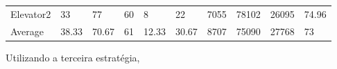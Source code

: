 \documentclass[a4paper]{article}
\begin{document}
\begin{table}[h]
\begin{tabular}{@{}llllllllll@{}}
Elevator2 & 33       & 77            & 60           & 8                                                               & 22                                                                  & 7055                                                         & 78102                                                 & 26095                                                   & 74.96         \\
Average   & 38.33     & 70.67         & 61        & 12.33                                                            & 30.67                                                               & 8707                                                         & 75090                                                 & 27768                                                   &  73         \\ \bottomrule
\end{tabular}
\end{table}

Utilizando a terceira estratégia,
\end{document}
